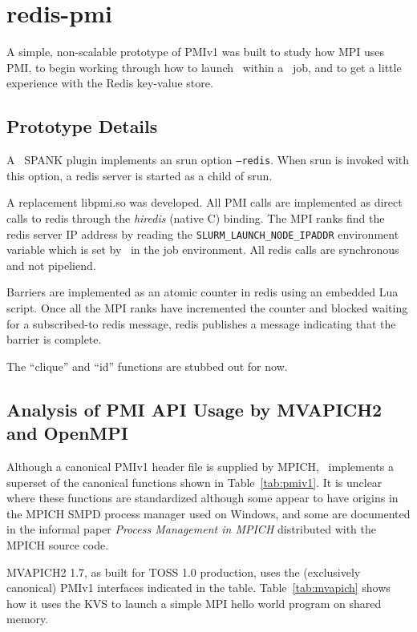 \section{redis-pmi}

A simple, non-scalable prototype of PMIv1 was built to study
how MPI uses PMI, to begin working through how to launch \ngrm\ 
within a \slurm\ job, and to get a little experience with the Redis
key-value store.

\subsection{Prototype Details}

A \slurm\ SPANK plugin implements an srun option {\tt --redis}.
When srun is invoked with this option, a redis server is started
as a child of srun.

A replacement libpmi.so was developed.  All PMI calls are implemented
as direct calls to redis through the {\em hiredis} (native C) binding.
The MPI ranks find the redis server IP address by reading the
{\tt SLURM\_LAUNCH\_NODE\_IPADDR} environment variable which is set
by \slurm\ in the job environment.
All redis calls are synchronous and not pipeliend.

Barriers are implemented as an atomic counter in redis using an embedded
Lua script.
Once all the MPI ranks have incremented the counter and blocked waiting
for a subscribed-to redis message, redis publishes a message indicating
that the barrier is complete.

The ``clique'' and ``id'' functions are stubbed out for now.

\subsection{Analysis of PMI API Usage by MVAPICH2 and OpenMPI}

Although a canonical PMIv1 header file is supplied by MPICH,
\slurm\ implements a superset of the canonical functions shown in
Table~\ref{tab:pmiv1}.  It is unclear where these functions are
standardized although some appear to have origins in the MPICH
SMPD process manager used on Windows, and some are documented in
the informal paper {\em Process Management in MPICH} distributed
with the MPICH source code.

MVAPICH2 1.7, as built for TOSS 1.0 production, uses the (exclusively
canonical) PMIv1 interfaces indicated in the table.
Table~\ref{tab:mvapich} shows how it uses the KVS to launch a simple MPI
hello world program on shared memory.

